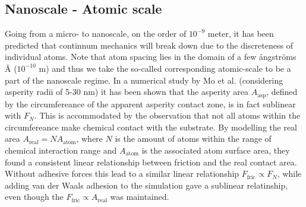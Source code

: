 
\subsection{Nanoscale - Atomic scale}
Going from a micro- to nanoscale, on the order of $10^{-9}$ meter, it has been
predicted that continnum mechanics will break down \cite{luan_breakdown_2005}
due to the discreteness of individual atoms. Note that atom spacing lies in the
domain of a few ångströms Å ($10^{-10}$ m) and thus we take the so-called
corresponding atomic-scale to be a part of the nanoscale regime. In a numerical
study by Mo et al. \cite{mo_friction_2009} (considering asperity radii of 5-30
nm) it has been shown that the asperity area $A_{\text{asp}}$, defined by the
circumfereance of the apparent asperity contact zone, is in fact sublinear with
$F_N$. This is accommodated by the observation that not all atoms within the
circumfereance make chemical contact with the substrate. By
modelling the real area $A_{\text{real}} = NA_{\text{atom}}$, where $N$ is the
amount of atoms within the range of chemical interaction range and
$A_{\text{atom}}$ is the associated atom surface area, they found a consistent
linear relationship between friction and the real contact area. Without adhesive
forces this lead to a similar linear relationship $F_{\text{fric}} \propto F_N$,
while adding van der Waals adhesion to the simulation gave a sublinear
relatinship, even though the $F_{\text{fric}} \propto A_{\text{real}}$ was
maintained. 

